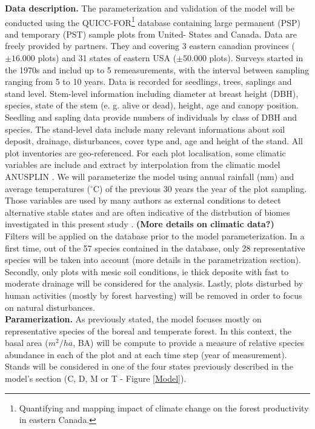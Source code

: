 \textbf{Data description.} The parameterization and validation of the model
will be conducted using the QUICC-FOR\footnote{Quantifying and mapping impact
of climate change on the forest productivity in eastern Canada.} database
containing large permanent (PSP) and temporary (PST) sample plots  from
United- States and Canada. Data are freely provided by partners. They and
covering 3 eastern canadian provinces ($\pm16.000$ plots) and 31 states of eastern USA
($\pm50.000$ plots). Surveys started in the 1970s and includ up to 5
remeasurements, with the interval between sampling ranging from 5 to 10 years.
Data is recorded for seedlings, trees, saplings and stand level. Stem-level
information including diameter at
breast height (DBH), species, state of the stem (e. g. alive or dead), height,
age and canopy position. Seedling and sapling data provide numbers of
individuals by class of DBH and species. The stand-level data include many
relevant informations about soil deposit, drainage, disturbances, cover type
and, age and height of the stand. All plot inventories are geo-referenced. For
each plot localisation, some climatic variables are include and extract by
interpolation from the climatic model ANUSPLIN \cite{McKenney2011}. We will parameterize the model using annual rainfall (mm)
and average temperatures (\ensuremath{^\circ}C) of the previous 30 years the
year of the plot sampling. Those variables are used by many authors as
external conditions to detect alternative stable states and are often
indicative of the distrbution of biomes investigated in this present study
\cite{Goldblum2010,Hirota2011,Scheffer2012}. \textbf{(More details on climatic
data?)}\\

Filters will be applied on
the database prior to the model parameterization.  In a first time, out of the 57 species contained in the 
database, only 28 representative species will be
taken into account (more details in the parametrization section).
Secondly,  only plots with mesic soil conditions, ie thick deposite with fast to moderate drainage
will be considered for the analysis. Lastly, plots disturbed by human activities (mostly by forest harvesting) will be removed in order
to focus on natural disturbances. \\


\textbf{Paramerization.} As previously stated, the model focuses mostly on
representative species of the boreal and temperate forest. In this context, the basal area ($m^2/ha$, BA) will be compute to
provide a measure of relative species abundance in each of the
plot and at each time step (year of measurement). Stands will be considered in one of the four states 
previously described in the model's
section (C, D, M or T - Figure \ref{Model}).

